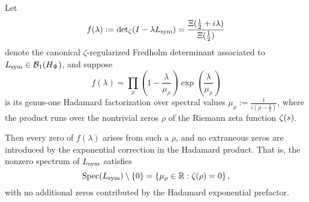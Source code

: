 \begin{lemma}
\label{lem:no_extraneous_zeros}
Let
\[
f(\lambda) := \det\nolimits_\zeta(I - \lambda L_{\mathrm{sym}}) = \frac{\Xi(\tfrac{1}{2} + i\lambda)}{\Xi(\tfrac{1}{2})}
\]
denote the canonical \(\zeta\)-regularized Fredholm determinant associated to \( L_{\mathrm{sym}} \in \mathcal{B}_1(H_{\Psi}) \), and suppose
\[
f(\lambda) = \prod_{\rho} \left(1 - \frac{\lambda}{\mu_\rho} \right) \exp\left( \frac{\lambda}{\mu_\rho} \right)
\]
is its genus-one Hadamard factorization over spectral values \( \mu_\rho := \frac{1}{i(\rho - \tfrac{1}{2})} \), where the product runs over the nontrivial zeros \( \rho \) of the Riemann zeta function \( \zeta(s) \).

Then every zero of \( f(\lambda) \) arises from such a \(\rho\), and no extraneous zeros are introduced by the exponential correction in the Hadamard product. That is, the nonzero spectrum of \( L_{\mathrm{sym}} \) satisfies
\[
\operatorname{Spec}(L_{\mathrm{sym}}) \setminus \{0\} = \left\{ \mu_\rho \in \mathbb{R} : \zeta(\rho) = 0 \right\},
\]
with no additional zeros contributed by the Hadamard exponential prefactor.
\end{lemma}
